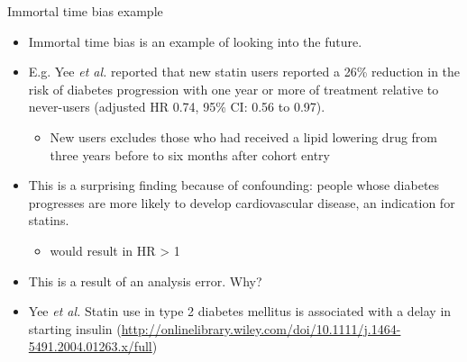 \documentclass[
  ignorenonframetext,
]{beamer}
\providecommand{\tightlist}{%
  \setlength{\itemsep}{0pt}\setlength{\parskip}{0pt}}
\begin{document}
\begin{frame}{Immortal time bias example}
\protect\hypertarget{immortal-time-bias-example}{}

\begin{itemize}
\tightlist
\item
  Immortal time bias is an example of looking into the future.
\item
  E.g. Yee \emph{et al.} reported that new statin users reported a 26\%
  reduction in the risk of diabetes progression with one year or more of
  treatment relative to never-users (adjusted HR 0.74, 95\% CI: 0.56 to
  0.97).

  \begin{itemize}
  \tightlist
  \item
    New users excludes those who had received a lipid lowering drug from
    three years before to six months after cohort entry
  \end{itemize}
\item
  This is a surprising finding because of confounding: people whose
  diabetes progresses are more likely to develop cardiovascular disease,
  an indication for statins.

  \begin{itemize}
  \tightlist
  \item
    would result in HR \textgreater{} 1
  \end{itemize}
\item
  This is a result of an analysis error. Why?
\end{itemize}

\tiny

\begin{itemize}
\tightlist
\item
  Yee \emph{et al.} Statin use in type 2 diabetes mellitus is associated
  with a delay in starting insulin
  (\url{http://onlinelibrary.wiley.com/doi/10.1111/j.1464-5491.2004.01263.x/full})
\end{itemize}

\end{frame}
\end{document}
